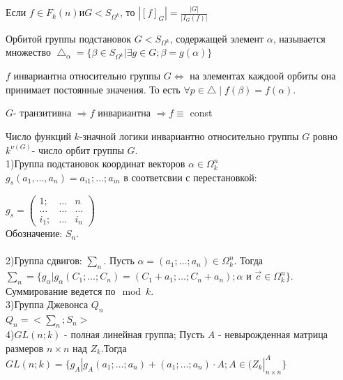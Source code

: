 \thr 
Если $f\in F_k(n) и G<S_{\Omega^k}$, то $|[f]_G|=\frac{|G|}{|I_G(f)|}$

\opr 
Орбитой группы подстановок $G<S_{\Omega^k}$, содержащей элемент $\alpha$, называется множество $\bigtriangleup_\alpha = \{ \beta \in S_{\Omega^k}|\exists g\in G;\beta =g(\alpha)\}$


\utv
$f$ инвариантна относительно группы $G \Leftrightarrow$ на элементах каждоой орбиты она принимает постоянные значения. То есть $\forall p \in \bigtriangleup \mid f(\beta) = f(\alpha)$.

\conseq
$G$- транзитивна $\Rightarrow f$ инвариантна $\Rightarrow f \equiv$ const

\conseq
Число функций $k$-значной логики инвариантно относительно группы $G$ ровно $k^{\nu(G)}$- число орбит группы $G$.\\

1)Группа подстановок координат векторов $\alpha \in \Omega_k^n $\\
$g_s(a_1, \dots , a_n)  =  a_{i1};\dots ;a_{in}$ в соответсвии с перестановкой: 

$g_s=
\begin{pmatrix}
  1;& \dots & n\\
  \dots & \dots & \dots\\
  i_1; & \dots & i_n
  
  
\end{pmatrix}$\\

Обозначение: $ S_n $.\\\\

2)Группа сдвигов: $ \sum_n $. Пусть $ \alpha = (a_1;\dots;a_n) \in \Omega_k^n $. Тогда $ \sum_n = \{g_\alpha|g_\alpha(C_1;\dots;C_n)=(C_1+a_1;\dots;C_n+a_n);\alpha$ и $\vec{c} \in \Omega_k^n\} $. 
Суммирование ведется по$ \mod k$.\\

3)Группа Джевонса $Q_n$\\
$Q_n = < \sum_n;S_n>$\\

4)$GL(n;k)$ - полная линейная группа; Пусть $A$ - невырожденная матрица размеров $n \times n $ над $ Z_k$.Тогда $GL(n;k)=\{g_A|g_A(a_1;\dots;a_n)+(a_1;\dots;a_n)\cdotp A; A \in (Z_k|_{n \times n}^A\}$\\

